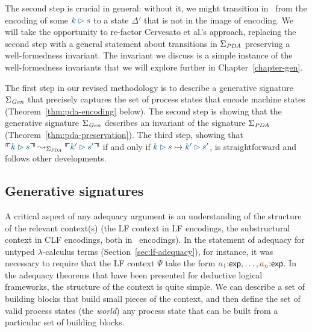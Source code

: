 The second step is crucial in general: without it, we might transition
in \sls~from the encoding of some $\obj{k \rhd s}$ to a state
$\Delta'$ that is not in the image of encoding. %
We will 
take the opportunity to re-factor Cervesato et al.'s approach, 
replacing the second step with a general statement about transitions
in $\Sigma_{\it PDA}$ preserving a well-formedness invariant. The 
invariant we discuss is a simple instance of
the well-formedness invariants that we will explore
further in Chapter~\ref{chapter-gen}. 

The first step in our revised methodology is to describe a generative
signature $\Sigma_{\it Gen}$ that precisely captures the set of
process states that encode machine states
(Theorem~\ref{thm:pda-encoding} below).  The second step is showing
that the generative signature $\Sigma_{\it Gen}$ describes an
invariant of the signature $\Sigma_{\it PDA}$
(Theorem~\ref{thm:pda-preservation}).  The third step, showing that
$\ctxinterp{k \rhd s} \leadsto_{\Sigma_{\it PDA}} \ctxinterp{k' \rhd
  s'}$ if and only if $\obj{k \rhd s} \mapsto \obj{k' \rhd s'}$, is
straightforward and follows other developments.

\subsection{Generative signatures}
\label{sec:framework-reggenworld}

A critical aspect of any adequacy argument is an understanding of the
structure of the relevant context(s) (the LF context in LF encodings,
the substructural context in CLF encodings, both in \sls~encodings).
In the statement of adequacy for untyped $\lambda$-calculus terms
(Section~\ref{sec:lf-adequacy}), for instance, it was necessary to
require that the LF context $\Psi$ take the form $\lf{a_1}{:}{\sf
  exp},\ldots,\lf{a_n}{:}{\sf exp}$. In the adequacy theorems that
have been presented for deductive logical frameworks, the structure of
the context is quite simple. We can describe a set of building
blocks that build small pieces of the context, and then define the set
of valid process states (the {\it world}) any process state that can be
built from a particular set of building blocks.  

